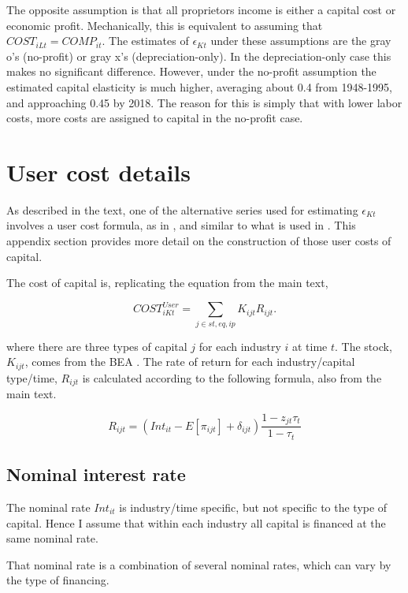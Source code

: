 \documentclass[11pt]{article}
\begin{document}
The opposite assumption is that all proprietors income is either a capital cost or economic profit. Mechanically, this is equivalent to assuming that $COST_{iLt} = COMP_{it}$. The estimates of $\epsilon_{Kt}$ under these assumptions are the gray o's (no-profit) or gray x's (depreciation-only). In the depreciation-only case this makes no significant difference. However, under the no-profit assumption the estimated capital elasticity is much higher, averaging about 0.4 from 1948-1995, and approaching 0.45 by 2018. The reason for this is simply that with lower labor costs, more costs are assigned to capital in the no-profit case. 

\section{User cost details}
As described in the text, one of the alternative series used for estimating $\epsilon_{Kt}$ involves a user cost formula, as in \cite{halljorg1967}, and similar to what is used in \cite{Barkai000,rognlie2015}. This appendix section provides more detail on the construction of those user costs of capital. 

The cost of capital is, replicating the equation from the main text,

\begin{equation}
	COST^{User}_{iKt} = \sum_{j \in st,eq,ip} K_{ijt} R_{ijt}.
\end{equation}

where there are three types of capital $j$ for each industry $i$ at time $t$. The stock, $K_{ijt}$, comes from the BEA \citep{beacap,beagov}. The rate of return for each industry/capital type/time, $R_{ijt}$ is calculated according to the following formula, also from the main text.

\begin{equation}
	R_{ijt} = (Int_{it} - E[\pi_{ijt}] + \delta_{ijt})\frac{1-z_{jt} \tau_t}{1-\tau_t}
\end{equation}

\subsection{Nominal interest rate}
The nominal rate $Int_{it}$ is industry/time specific, but not specific to the type of capital. Hence I assume that within each industry all capital is financed at the same nominal rate.

That nominal rate is a combination of several nominal rates, which can vary by the type of financing. 
\end{document}
